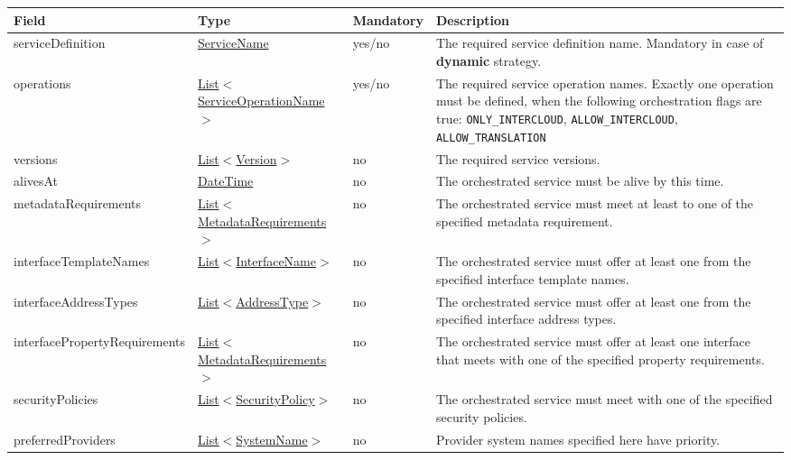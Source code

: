 \documentclass[a4paper]{arrowhead}
\newcommand{\pref}[1]{{\textcolor{ArrowheadGrey}{\hyperref[sec:model:primitives:#1]{#1}}}}
\begin{document}
\clearpage


\begin{table}[ht!]
\begin{tabularx}{\textwidth}{| p{4.8cm} | p{4.7cm} | p{2cm} | X |} \hline
\rowcolor{gray!33} Field & Type & Mandatory & Description \\ \hline
serviceDefinition & \pref{ServiceName} & yes/no & The required service definition name. Mandatory in case of \textbf{dynamic} strategy. \\ \hline
operations & \pref{List}$<$\pref{ServiceOperationName}$>$ & yes/no & The required service operation names. \newline 
Exactly one operation must be defined, when the following orchestration flags are true: \newline \texttt{ONLY\_INTERCLOUD}, \texttt{ALLOW\_INTERCLOUD}, \texttt{ALLOW\_TRANSLATION} \\ \hline
versions & \pref{List}$<$\pref{Version}$>$ & no & The required service versions. \\ \hline 
alivesAt & \pref{DateTime} & no & The orchestrated service must be alive by this time. \\ \hline
metadataRequirements & \pref{List}$<$\hyperref[sec:model:MetadataRequirements]{MetadataRequirements}$>$ & no & The orchestrated service must meet at least to one of the specified metadata requirement. \\ \hline
interfaceTemplateNames & \pref{List}$<$\pref{InterfaceName}$>$ & no & The orchestrated service must offer at least one from the specified interface template names. \\ \hline 
interfaceAddressTypes & \pref{List}$<$\pref{AddressType}$>$ & no & The orchestrated service must offer at least one from the specified interface address types. \\ \hline
interfacePropertyRequirements & \pref{List}$<$\hyperref[sec:model:MetadataRequirements]{MetadataRequirements}$>$ & no & The orchestrated service must offer at least one interface that meets with one of the specified property requirements. \\ \hline
securityPolicies & \pref{List}$<$\pref{SecurityPolicy}$>$ & no & The orchestrated service must meet with one of the specified security policies. \\ \hline
preferredProviders & \pref{List}$<$\pref{SystemName}$>$ & no & Provider system names specified here have priority. \\ \hline
\end{tabularx}
\end{table}
\end{document}
